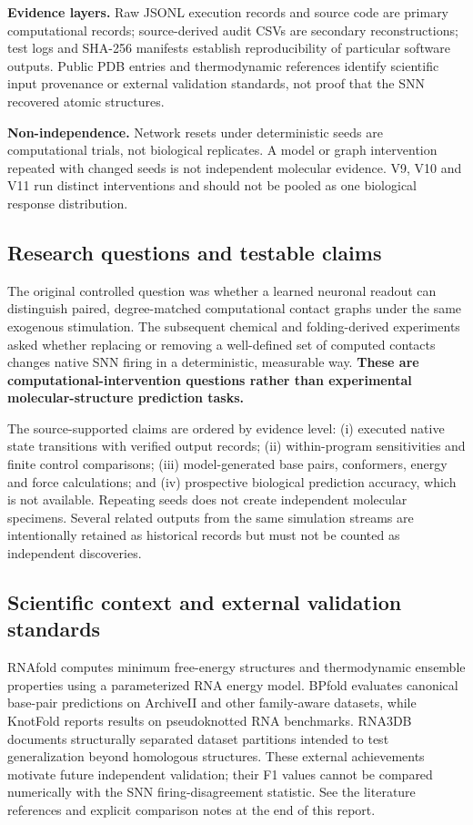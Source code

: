\documentclass[11pt,a4paper]{article}
\begin{document}
\textbf{Evidence layers.} Raw JSONL execution records and source code are primary computational records; source-derived audit CSVs are secondary reconstructions; test logs and SHA-256 manifests establish reproducibility of particular software outputs. Public PDB entries and thermodynamic references identify scientific input provenance or external validation standards, not proof that the SNN recovered atomic structures.

\textbf{Non-independence.} Network resets under deterministic seeds are computational trials, not biological replicates. A model or graph intervention repeated with changed seeds is not independent molecular evidence. V9, V10 and V11 run distinct interventions and should not be pooled as one biological response distribution.


\subsection{Research questions and testable claims}
The original controlled question was whether a learned neuronal readout can distinguish paired, degree-matched computational contact graphs under the same exogenous stimulation. The subsequent chemical and folding-derived experiments asked whether replacing or removing a well-defined set of computed contacts changes native SNN firing in a deterministic, measurable way. \textbf{These are computational-intervention questions rather than experimental molecular-structure prediction tasks.}

The source-supported claims are ordered by evidence level: (i) executed native state transitions with verified output records; (ii) within-program sensitivities and finite control comparisons; (iii) model-generated base pairs, conformers, energy and force calculations; and (iv) prospective biological prediction accuracy, which is not available. Repeating seeds does not create independent molecular specimens. Several related outputs from the same simulation streams are intentionally retained as historical records but must not be counted as independent discoveries.

\subsection{Scientific context and external validation standards}
RNAfold computes minimum free-energy structures and thermodynamic ensemble properties using a parameterized RNA energy model. BPfold evaluates canonical base-pair predictions on ArchiveII and other family-aware datasets, while KnotFold reports results on pseudoknotted RNA benchmarks. RNA3DB documents structurally separated dataset partitions intended to test generalization beyond homologous structures. These external achievements motivate future independent validation; their F1 values cannot be compared numerically with the SNN firing-disagreement statistic. See the literature references and explicit comparison notes at the end of this report.
\end{document}
